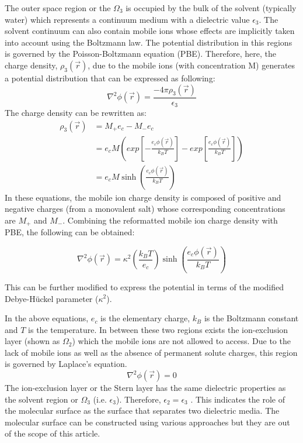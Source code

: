 \documentclass[9pt,tutorial]{livecoms}
\begin{document}
The outer space region or the $ \Omega_3 $ is occupied by the bulk of the solvent (typically water) which represents a continuum medium with a dielectric value $ \epsilon_3 $. The solvent continuum can also contain mobile ions whose effects are implicitly taken into account using the Boltzmann law. The potential distribution in this regions is governed by the Poisson-Boltzmann equation (PBE). Therefore, here, the charge density, $ \rho_3(\Vec{r}) $, due to the mobile ions (with concentration M) generates a potential distribution that can be expressed as following:
\begin{equation}\label{eqn:pbe_1}
\nabla^2\phi(\Vec{r}) = \frac{-4\pi\rho_3(\Vec{r})}{\epsilon_3} 
\end{equation}
The charge density can be rewritten as:
\begin{align}\label{eqn:pbe_2}
\rho_3(\Vec{r}) &= M_+ e_c - M_- e_c \nonumber \\
&= e_c M \left(exp\left[ - \frac{e_c\phi(\Vec{r})}{k_BT}\right] - exp\left[  \frac{e_c\phi(\Vec{r})}{k_BT}\right]\right) \nonumber \\
&= e_c M \sinh\left({\frac{e_c\phi(\Vec{r})}{k_BT}}\right)
\end{align}
In these equations, the mobile ion charge density is composed of positive and negative charges (from a monovalent salt) whose corresponding concentrations are $ M_+ $ and $ M_- $. Combining the reformatted mobile ion charge density with PBE, the following can be obtained:

\begin{equation}\label{eqn:pbe_3}
\nabla^2\phi(\Vec{r}) = \kappa^2 \left (\frac{k_BT}{e_c} \right) \sinh\left({\frac{e_c\phi(\Vec{r})}{k_BT}} \right)
\end{equation}

This can be further modified to express the potential in terms of the modified Debye-Hückel parameter ($\kappa^2$).

In the above equations, $ e_c $ is the elementary charge, $ k_B $ is the Boltzmann constant and $ T $ is the temperature.
In between these two regions exists the ion-exclusion layer (shown as $ \Omega_2 $) which the mobile ions are not allowed to access. Due to the lack of mobile ions as well as the absence of permanent solute charges, this region is governed by Laplace’s equation.
\begin{equation}
\nabla^2\phi(\Vec{r}) = 0
\end{equation}
The ion-exclusion layer or the Stern layer has the same dielectric properties as the solvent region or $ \Omega_3 $ (i.e. $ \epsilon_3 $). Therefore, $ \epsilon_2=\epsilon_3 $ . This indicates the role of the molecular surface as the surface that separates two dielectric media. The molecular surface can be constructed using various approaches but they are out of the scope of this article\cite{rocchia2002rapid,chakravorty2019grid,decherchi2013between}. 
\end{document}

